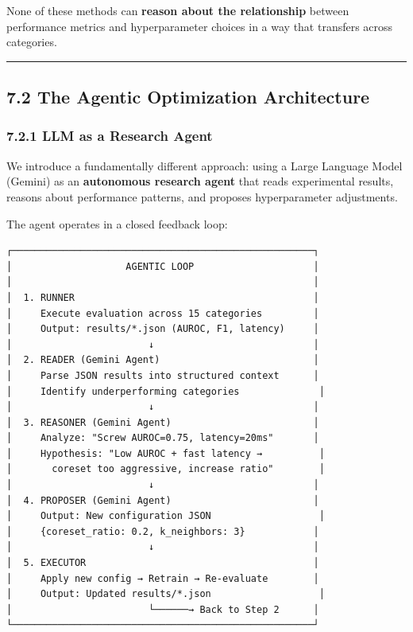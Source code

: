 None of these methods can \textbf{reason about the relationship} between performance metrics and hyperparameter choices in a way that transfers across categories.

\begin{center}\rule{0.5\linewidth}{0.5pt}\end{center}

\subsection{7.2 The Agentic Optimization Architecture}\label{the-agentic-optimization-architecture}

\subsubsection{7.2.1 LLM as a Research Agent}\label{llm-as-a-research-agent}

We introduce a fundamentally different approach: using a Large Language Model (Gemini) as an \textbf{autonomous research agent} that reads experimental results, reasons about performance patterns, and proposes hyperparameter adjustments.

The agent operates in a closed feedback loop:

\begin{verbatim}
┌─────────────────────────────────────────────────────┐
│                    AGENTIC LOOP                     │
│                                                     │
│  1. RUNNER                                          │
│     Execute evaluation across 15 categories         │
│     Output: results/*.json (AUROC, F1, latency)     │
│                        ↓                            │
│  2. READER (Gemini Agent)                           │
│     Parse JSON results into structured context      │
│     Identify underperforming categories              │
│                        ↓                            │
│  3. REASONER (Gemini Agent)                         │
│     Analyze: "Screw AUROC=0.75, latency=20ms"       │
│     Hypothesis: "Low AUROC + fast latency →          │
│       coreset too aggressive, increase ratio"        │
│                        ↓                            │
│  4. PROPOSER (Gemini Agent)                         │
│     Output: New configuration JSON                   │
│     {coreset_ratio: 0.2, k_neighbors: 3}            │
│                        ↓                            │
│  5. EXECUTOR                                        │
│     Apply new config → Retrain → Re-evaluate        │
│     Output: Updated results/*.json                   │
│                        └──────→ Back to Step 2      │
└─────────────────────────────────────────────────────┘
\end{verbatim}

